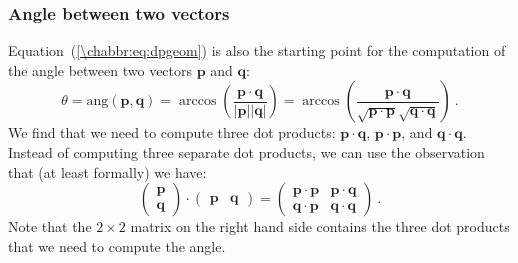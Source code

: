 \subsubsection{Angle between two vectors}
Equation~(\ref{\chabbr:eq:dpgeom}) is also the starting point for the computation of the angle between two vectors $\mathbf{p}$ and $\mathbf{q}$:
\begin{equation}
	\theta = \text{ang}(\mathbf{p},\mathbf{q}) = \arccos\left( \frac{\mathbf{p}\cdot\mathbf{q}}{\vert\mathbf{p}\vert\vert\mathbf{q}\vert}\right) = 
	\arccos\left( \frac{\mathbf{p}\cdot\mathbf{q}}{\sqrt{\mathbf{p}\cdot\mathbf{p}}\sqrt{\mathbf{q}\cdot\mathbf{q}}}\right) \ .\label{\chabbr:eq:defangle}
\end{equation}
We find that we need to compute three dot products: $\mathbf{p}\cdot\mathbf{q}$, $\mathbf{p}\cdot\mathbf{p}$, and $\mathbf{q}\cdot\mathbf{q}$.  Instead of computing three separate dot products, we can use the observation that (at least formally) we have:
\[
	\begin{pmatrix}\mathbf{p}\\ \mathbf{q}\end{pmatrix}\cdot\begin{pmatrix}\mathbf{p}&\mathbf{q}\end{pmatrix}
	 = \begin{pmatrix}\mathbf{p}\cdot\mathbf{p}&\mathbf{p}\cdot\mathbf{q}\\
	\mathbf{q}\cdot\mathbf{p}&\mathbf{q}\cdot\mathbf{q}\end{pmatrix} \ .
\]
Note that the $2\times 2$ matrix on the right hand side contains the three dot products that we need to compute the angle.  

